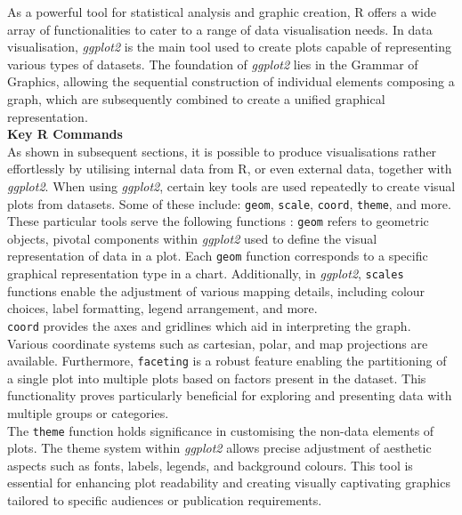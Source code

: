 \documentclass{article}\usepackage[]{graphicx}\usepackage[]{xcolor}
\numberwithin{equation}{section}
\begin{document}
As a powerful tool for statistical analysis and graphic creation, R offers a wide array of functionalities to cater to a range of data visualisation needs. In data visualisation, \textit{ggplot2} is the main tool used to create plots capable of representing various types of datasets. The foundation of \textit{ggplot2} lies in the Grammar of Graphics, allowing the sequential construction of individual elements composing a graph, which are subsequently combined to create a unified graphical representation.\\

\noindent\textbf{Key R Commands}\\
\noindent 
As shown in subsequent sections, it is possible to produce visualisations rather effortlessly by utilising internal data from R, or even external data, together with \textit{ggplot2}. When using \textit{ggplot2}, certain key tools are used repeatedly to create visual plots from datasets. Some of these include: \texttt{geom}, \texttt{scale}, \texttt{coord}, \texttt{theme}, and more.\\


\noindent 
These particular tools serve the following functions \cite{ggplot2}: %
\noindent
\texttt{geom} refers to geometric objects, pivotal components within \textit{ggplot2} used to define the visual representation of data in a plot. Each \texttt{geom} function corresponds to a specific graphical representation type in a chart. Additionally, in \textit{ggplot2}, \texttt{scales} functions enable the adjustment of various mapping details, including colour choices, label formatting, legend arrangement, and more.\\

\noindent \texttt{coord} provides the axes and gridlines which aid in interpreting the graph. Various coordinate systems such as cartesian, polar, and map projections are available. Furthermore, \texttt{faceting} is a robust feature enabling the partitioning of a single plot into multiple plots based on factors present in the dataset. This functionality proves particularly beneficial for exploring and presenting data with multiple groups or categories.\\

\noindent The \texttt{theme} function holds significance in customising the non-data elements of plots. The theme system within \textit{ggplot2} allows precise adjustment of aesthetic aspects such as fonts, labels, legends, and background colours. This tool is essential for enhancing plot readability and creating visually captivating graphics tailored to specific audiences or publication requirements.\\
\end{document}
